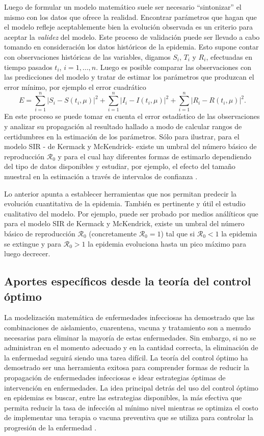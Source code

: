 \documentclass{article}
\begin{document}
 Luego de formular un modelo matemático suele ser necesario ``sintonizar'' el mismo con los datos que ofrece la realidad. Encontrar parámetros que hagan que el modelo refleje aceptablemente bien la evolución observada es un criterio para aceptar la \emph{validez} del modelo. Este proceso de validación puede ser llevado a cabo tomando en consideración los datos históricos de la epidemia. Esto supone contar con observaciones históricas de las variables, digamos $S_i$, $T_i$ y $R_i$, efectuadas en tiempo pasados $t_i$, $i=1,\ldots,n$. Luego es posible comparar las observaciones con las predicciones del modelo y tratar de estimar los parámetros que produzcan el error mínimo, por ejemplo el error cuadrático
 \[
 E=\sum_{i=1}^n|S_i-S(t_i,\mu)|^2+\sum_{i=1}^n|I_i-I(t_i,\mu)|^2+\sum_{i=1}^n|R_i-R(t_i,\mu)|^2.
 \]
 En este proceso se puede tomar en cuenta el error estadístico de  las observaciones y analizar su propagación al resultado hallado a modo de calcular  rangos de certidumbres en la estimación de los parámetros. Sólo para ilustrar, para el modelo SIR - de  Kermack y McKendrick-  existe un  umbral   del número básico de reproducción $\mathcal{R}_0$   y para el cual hay diferentes formas de estimarlo dependiendo del tipo de datos disponibles y estudiar, por ejemplo, el efecto del tamaño muestral en la estimación a través de intervalos de confianza \citep{KR}.
 
  
 Lo anterior apunta a establecer herramientas  que nos permitan predecir la evolución cuantitativa de la epidemia. También es pertinente y útil el estudio cualitativo del modelo.  Por ejemplo, puede ser probado por medios análíticos que para el modelo SIR de 
 Kermack y McKendrick, existe un  umbral   del número básico de reproducción $\mathcal{R}_0$ (concretamente $\mathcal{R}_0=1$) tal que si $\mathcal{R}_0<1$ la epidemia se extingue y para $\mathcal{R}_0>1$ la epidemia evoluciona hasta un pico máximo para luego decrecer. 
  
 
 \subsection{Aportes específicos desde la teoría del control óptimo } 

 
 La modelización matemática de enfermedades infecciosas ha demostrado que las combinaciones de aislamiento, cuarentena, vacuna y tratamiento son a menudo necesarias para eliminar la mayoría de estas enfermedades. Sin embargo, si no se administran en el momento adecuado y en la cantidad correcta, la eliminación de la enfermedad seguirá siendo una tarea difícil. La teoría del control óptimo ha demostrado ser una herramienta exitosa para comprender formas de reducir la propagación de enfermedades infecciosas e idear estrategias óptimas de intervención en enfermedades. La idea principal detrás del uso del control óptimo en epidemias es buscar, entre las estrategias disponibles, la más efectiva que permita reducir la tasa de infección al mínimo nivel mientras se optimiza el costo de implementar una terapia o vacuna preventiva que se utiliza para controlar la progresión de la enfermedad \cite{GerardoChowell487}. 
 
\end{document}
